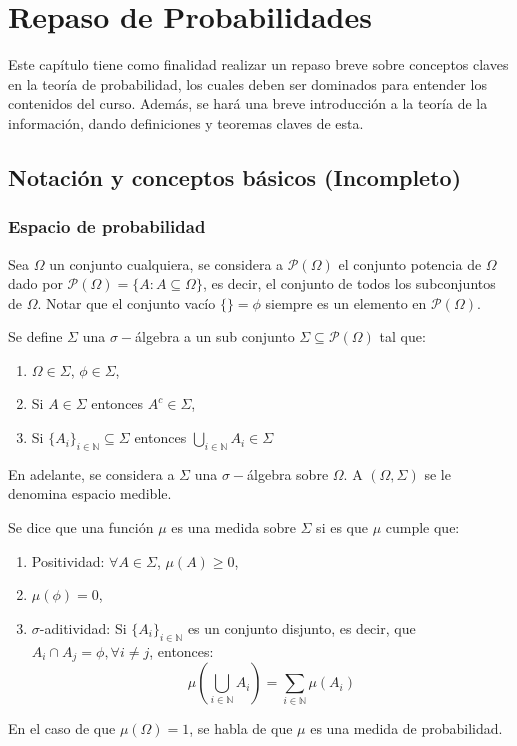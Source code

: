 \chapter{Repaso de Probabilidades}

Este capítulo tiene como finalidad realizar un repaso breve sobre conceptos claves en la teoría de probabilidad, los cuales deben ser dominados para entender los contenidos del curso. Además, se hará una breve introducción a la teoría de la información, dando definiciones y teoremas claves de esta.

\section{Notación y conceptos básicos (Incompleto)}

\subsection{Espacio de probabilidad}

Sea $\Omega$ un conjunto cualquiera, se considera a $\mathcal{P}(\Omega)$ el conjunto potencia de $\Omega$ dado por $\mathcal{P}(\Omega)=\{A:A\subseteq \Omega\}$, es decir, el conjunto de todos los subconjuntos de $\Omega$. Notar que el conjunto  vacío $\{\}=\phi$ siempre es un elemento en $\mathcal{P}(\Omega)$. 

\begin{definition} Se define $\Sigma$ una $\sigma-$álgebra a un sub conjunto $\Sigma\subseteq\mathcal{P}(\Omega)$ tal que:
\begin{enumerate}
    \item $\Omega\in\Sigma$, $\phi\in\Sigma$,
    \item Si $A\in\Sigma$ entonces $A^{c}\in\Sigma$,
    \item Si $\{A_i\}_{i\in\mathbb{N}}\subseteq \Sigma$ entonces $\bigcup\limits_{i\in\mathbb{N}}A_i\in\Sigma$
\end{enumerate}
\end{definition}

En adelante, se considera a $\Sigma$ una $\sigma-$álgebra sobre $\Omega$. A $(\Omega, \Sigma)$ se le denomina espacio medible. 

\begin{definition}[Medida]
Se dice que una función $\mu$ es una medida sobre $\Sigma$ si es que $\mu$ cumple que:

\begin{enumerate}
    \item Positividad: $\forall A \in\Sigma$, $\mu(A)\geq 0$,
    \item $\mu(\phi)=0$,
    \item $\sigma$-aditividad: Si $\{A_i\}_{i\in\mathbb{N}}$ es un conjunto disjunto, es decir, que $A_i\cap A_j=\phi, \forall i\neq j$, entonces:
    \[\mu\left( \bigcup\limits_{i\in\mathbb{N}}A_i \right)=\sum_{i\in\mathbb{N}}\mu(A_i)\]
    
\end{enumerate}
En el caso de que $\mu(\Omega)=1$, se habla de que $\mu$ es una medida de probabilidad.
\end{definition}

